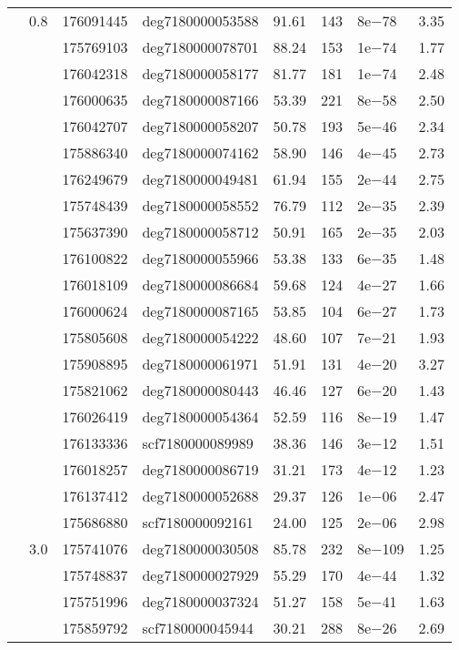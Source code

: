 \begin{table}
\begin{tabularx}{\textwidth}{p{2.5cm}p{0.5cm}p{3.5cm}Xp{0.5cm}p{0.5cm}p{0.8cm}p{0.5cm}}
 & 0.8 & 176091445 & deg7180000053588 & 91.61 & 143 & 8e$-$78 & 3.35 \\
 &  & 175769103 & deg7180000078701 & 88.24 & 153 & 1e$-$74 & 1.77 \\
 &  & 176042318 & deg7180000058177 & 81.77 & 181 & 1e$-$74 & 2.48 \\
 &  & 176000635 & deg7180000087166 & 53.39 & 221 & 8e$-$58 & 2.50 \\
 &  & 176042707 & deg7180000058207 & 50.78 & 193 & 5e$-$46 & 2.34 \\
 &  & 175886340 & deg7180000074162 & 58.90 & 146 & 4e$-$45 & 2.73 \\
 &  & 176249679 & deg7180000049481 & 61.94 & 155 & 2e$-$44 & 2.75 \\
 &  & 175748439 & deg7180000058552 & 76.79 & 112 & 2e$-$35 & 2.39 \\
 &  & 175637390 & deg7180000058712 & 50.91 & 165 & 2e$-$35 & 2.03 \\
 &  & 176100822 & deg7180000055966 & 53.38 & 133 & 6e$-$35 & 1.48 \\
 &  & 176018109 & deg7180000086684 & 59.68 & 124 & 4e$-$27 & 1.66 \\
 &  & 176000624 & deg7180000087165 & 53.85 & 104 & 6e$-$27 & 1.73 \\
 &  & 175805608 & deg7180000054222 & 48.60 & 107 & 7e$-$21 & 1.93 \\
 &  & 175908895 & deg7180000061971 & 51.91 & 131 & 4e$-$20 & 3.27 \\
 &  & 175821062 & deg7180000080443 & 46.46 & 127 & 6e$-$20 & 1.43 \\
 &  & 176026419 & deg7180000054364 & 52.59 & 116 & 8e$-$19 & 1.47 \\
 &  & 176133336 & scf7180000089989 & 38.36 & 146 & 3e$-$12 & 1.51 \\
 &  & 176018257 & deg7180000086719 & 31.21 & 173 & 4e$-$12 & 1.23 \\
 &  & 176137412 & deg7180000052688 & 29.37 & 126 & 1e$-$06 & 2.47 \\
 &  & 175686880 & scf7180000092161 & 24.00 & 125 & 2e$-$06 & 2.98 \\
 & 3.0 & 175741076 & deg7180000030508 & 85.78 & 232 & 8e$-$109 & 1.25 \\
 &  & 175748837 & deg7180000027929 & 55.29 & 170 & 4e$-$44 & 1.32 \\
 &  & 175751996 & deg7180000037324 & 51.27 & 158 & 5e$-$41 & 1.63 \\
 &  & 175859792 & scf7180000045944 & 30.21 & 288 & 8e$-$26 & 2.69 \\


\end{tabularx}
\end{table}
